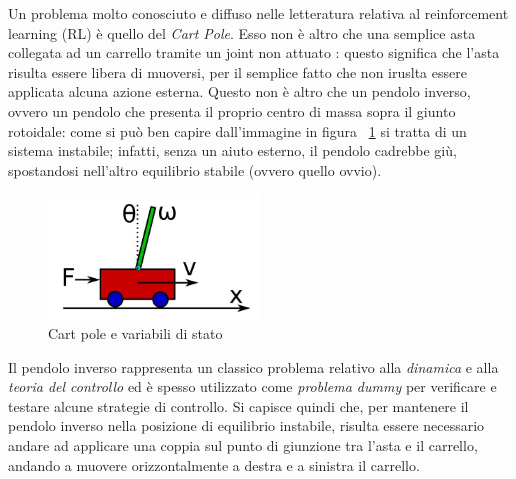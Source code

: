 Un problema molto conosciuto e diffuso nelle letteratura relativa al reinforcement learning (RL) è quello del \textit{Cart Pole}.
Esso non è altro che una semplice asta collegata ad un carrello tramite un joint non attuato : questo significa che l'asta risulta essere libera di muoversi, per il semplice fatto che non iruslta essere applicata alcuna azione esterna.
Questo non è altro che un pendolo inverso, ovvero un pendolo che presenta il proprio centro di massa sopra il giunto rotoidale: come si può ben capire dall'immagine in figura ~\ref{fig:CartPole} si tratta di un sistema instabile; infatti, senza un aiuto esterno, il pendolo cadrebbe giù, spostandosi nell'altro equilibrio stabile (ovvero quello ovvio).

\begin{figure}[h]
	\centering
	\includegraphics[width=0.5\textwidth]{Immagini/CartPole.JPG}
	\caption{Cart pole e variabili di stato}
	\label{fig:CartPole}
\end{figure}

Il pendolo inverso rappresenta un classico problema relativo alla \textit{dinamica} e alla \textit{teoria del controllo} ed è spesso utilizzato come \textit{problema dummy} per verificare e testare alcune strategie di controllo.
Si capisce quindi che, per mantenere il pendolo inverso nella posizione di equilibrio instabile, risulta essere necessario andare ad applicare una coppia sul punto di giunzione tra l'asta e il carrello, andando a muovere orizzontalmente a destra e a sinistra il carrello.
